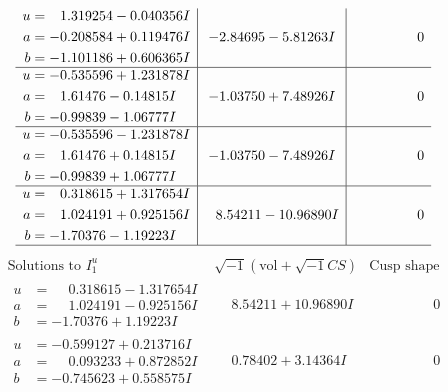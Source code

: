 \documentclass[1p]{elsarticle_modified}
\theoremstyle{definition}
\newcommand{\I}{\sqrt{-1}}
\begin{document}
$$\begin{array}{c|c|c}
\begin{aligned}
u &= \phantom{-}1.319254 - 0.040356 I \\
a &= -0.208584 + 0.119476 I \\
b &= -1.101186 + 0.606365 I\end{aligned}
 & -2.84695 - 5.81263 I & \phantom{-0.000000 } 0 \\ \hline\begin{aligned}
u &= -0.535596 + 1.231878 I \\
a &= \phantom{-}1.61476 - 0.14815 I \\
b &= -0.99839 - 1.06777 I\end{aligned}
 & -1.03750 + 7.48926 I & \phantom{-0.000000 } 0 \\ \hline\begin{aligned}
u &= -0.535596 - 1.231878 I \\
a &= \phantom{-}1.61476 + 0.14815 I \\
b &= -0.99839 + 1.06777 I\end{aligned}
 & -1.03750 - 7.48926 I & \phantom{-0.000000 } 0 \\ \hline\begin{aligned}
u &= \phantom{-}0.318615 + 1.317654 I \\
a &= \phantom{-}1.024191 + 0.925156 I \\
b &= -1.70376 - 1.19223 I\end{aligned}
 & \phantom{-}8.54211 - 10.96890 I & \phantom{-0.000000 } 0\\
 \hline 
 \end{array}$$\newpage$$\begin{array}{c|c|c}  
\text{Solutions to }I^u_{1}& \I (\text{vol} + \sqrt{-1}CS) & \text{Cusp shape}\\
 \hline 
\begin{aligned}
u &= \phantom{-}0.318615 - 1.317654 I \\
a &= \phantom{-}1.024191 - 0.925156 I \\
b &= -1.70376 + 1.19223 I\end{aligned}
 & \phantom{-}8.54211 + 10.96890 I & \phantom{-0.000000 } 0 \\ \hline\begin{aligned}
u &= -0.599127 + 0.213716 I \\
a &= \phantom{-}0.093233 + 0.872852 I \\
b &= -0.745623 + 0.558575 I\end{aligned}
 & \phantom{-}0.78402 + 3.14364 I & \phantom{-0.000000 } 0 \\ \hline\begin{aligned}

\end{aligned}
\end{array}$$
\end{document}
